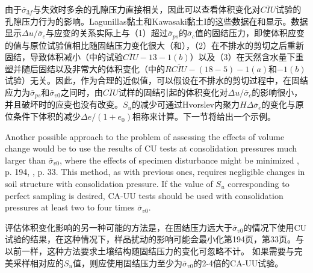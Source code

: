 \begin{paracol}{2}
    由于$\overline{\sigma}_{3f}$与失效时多余的孔隙压力直接相关，因此可以查看体积变化对$\overline{CIU}$试验的孔隙压力行为的影响。Lagunillas黏土和Kawasaki黏土I的这些数据在和显示。数据显示$\Delta{}u/\overline{\sigma}_c$与应变的关系实际上与（1）超过$\overline{\sigma}_{ps}$的$\overline{\sigma}_c$值的固结压力，即使体积应变的值与原位试验值相比随固结压力变化很大（和），（2）在不排水的剪切之后重新固结，导致体积减小（中的试验$\overline{CIU}-13-1(b)$）以及（3）在天然含水量下重塑并随后固结以及非常大的体积变化（中的$R\overline{CIU}-(18-5)-1(a)$和$-1(b)$试验）无关。因此，作为合理的近似值，可以假设在不排水的剪切过程中，在固结应力为$\overline{\sigma}_{ps}$和$\overline{\sigma}_{v0}$之间时，由$\overline{CIU}$试样的固结引起的体积变化对$\Delta{}u/\overline{\sigma}_c$的影响很小，并且破坏时的应变也没有改变。$S_u$的减少可通过Hvorslev内聚力$H\Delta{}\overline{\sigma}_e$的变化与原位条件下体积的减少$\Delta{}e/(1+e_0)$相称来计算。下一节将给出一个示例。

    \switchcolumn*

    Another possible approach to the problem of assessing the effects of volume change would be to use the results of CU tests at consolidation pressures much larger than $\overline{\sigma}_{v0}$, where the effects of specimen disturbance might be minimized \citet{Marsal1957229}, p. 194, \citet{Casagrande1953}, p. 33. This method, as with previous ones, requires negligible changes in soil structure with consolidation pressure. If the value of $S_u$ corresponding to perfect sampling is desired, CA-UU tests should be used with consolidation pressures at least two to four times $\overline{\sigma}_{v0}$.

    \switchcolumn

    评估体积变化影响的另一种可能的方法是，在固结压力远大于$\overline{\sigma}_{v0}$的情况下使用CU试验的结果，在这种情况下，样品扰动的影响可能会最小化\citet{Marsal1957229}第194页，\citet{Casagrande1953}第33页。与以前一样，这种方法要求土壤结构随固结压力的变化可忽略不计。 如果需要与完美采样相对应的$S_u$值，则应使用固结压力至少为$\overline{\sigma}_{v0}$的2-4倍的CA-UU试验。

\end{paracol}